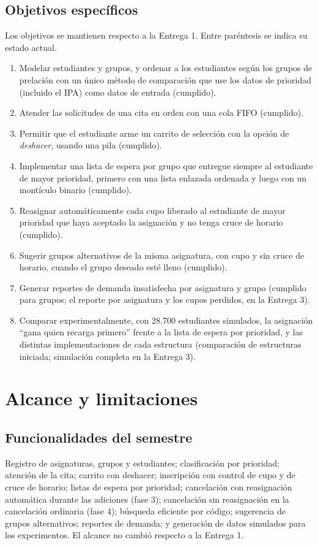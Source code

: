 \documentclass[conference]{IEEEtran}
\begin{document}
\subsection{Objetivos específicos}
Los objetivos se mantienen respecto a la Entrega 1. Entre paréntesis se indica su estado actual.
\begin{enumerate}
    \item Modelar estudiantes y grupos, y ordenar a los estudiantes según los grupos de prelación con un único método de comparación que use los datos de prioridad (incluido el IPA) como datos de entrada (cumplido).
    \item Atender las solicitudes de una cita en orden con una cola FIFO (cumplido).
    \item Permitir que el estudiante arme un carrito de selección con la opción de \emph{deshacer}, usando una pila (cumplido).
    \item Implementar una lista de espera por grupo que entregue siempre al estudiante de mayor prioridad, primero con una lista enlazada ordenada y luego con un montículo binario (cumplido).
    \item Reasignar automáticamente cada cupo liberado al estudiante de mayor prioridad que haya aceptado la asignación y no tenga cruce de horario (cumplido).
    \item Sugerir grupos alternativos de la misma asignatura, con cupo y sin cruce de horario, cuando el grupo deseado esté lleno (cumplido).
    \item Generar reportes de demanda insatisfecha por asignatura y grupo (cumplido para grupos; el reporte por asignatura y los cupos perdidos, en la Entrega 3).
    \item Comparar experimentalmente, con 28.700 estudiantes simulados, la asignación ``gana quien recarga primero'' frente a la lista de espera por prioridad, y las distintas implementaciones de cada estructura (comparación de estructuras iniciada; simulación completa en la Entrega 3).
\end{enumerate}


\section{Alcance y limitaciones}

\subsection{Funcionalidades del semestre}
Registro de asignaturas, grupos y estudiantes; clasificación por prioridad; atención de la cita; carrito con deshacer; inscripción con control de cupo y de cruce de horario; listas de espera por prioridad; cancelación con reasignación automática durante las adiciones (fase 3); cancelación sin reasignación en la cancelación ordinaria (fase 4); búsqueda eficiente por código; sugerencia de grupos alternativos; reportes de demanda; y generación de datos simulados para los experimentos. El alcance no cambió respecto a la Entrega 1.
\end{document}

